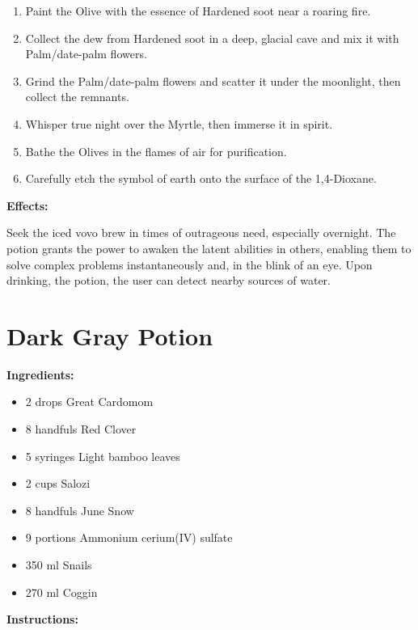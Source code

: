 \documentclass{article}
\begin{document}
\begin{enumerate}
  \item Paint the Olive with the essence of Hardened soot near a roaring fire.
  \item Collect the dew from Hardened soot in a deep, glacial cave and mix it with Palm/date-palm  flowers.
  \item Grind the Palm/date-palm  flowers and scatter it under the moonlight, then collect the remnants.
  \item Whisper true night over the Myrtle, then immerse it in spirit.
  \item Bathe the Olives in the flames of air for purification.
  \item Carefully etch the symbol of earth onto the surface of the 1,4-Dioxane.
\end{enumerate}

\textbf{Effects:}

Seek the iced vovo brew in times of outrageous need, especially overnight. The potion grants the power to awaken the latent abilities in others, enabling them to solve complex problems instantaneously and, in the blink of an eye. Upon drinking, the potion, the user can detect nearby sources of water.

\newpage
\section*{Dark Gray Potion}

\textbf{Ingredients:}

\begin{itemize}
  \item 2 drops Great Cardomom
  \item 8 handfuls Red Clover
  \item 5 syringes Light bamboo leaves
  \item 2 cups Salozi
  \item 8 handfuls June Snow
  \item 9 portions Ammonium cerium(IV) sulfate
  \item 350 ml Snails
  \item 270 ml Coggin
\end{itemize}

\textbf{Instructions:}
\end{document}
